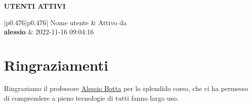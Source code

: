 \documentclass[letterpaper, 11pt]{article}
\begin{document}
\begin{center}
\textbf{UTENTI ATTIVI}
\end{center}

\begin{center}
  \begin{tabular}{{|p{0.476\textwidth}|p{0.476\textwidth}|}}
    \hline
        Nome utente & Attivo da\\
    \hline
        \textbf{alessio} & 2022-11-16 09:04:16\\
    \hline
  \end{tabular}
\end{center}
\section{Ringraziamenti}
\label{sec:org4a41ac3}
Ringraziamo il professore \href{mailto:a.botta@unina.it}{Alessio Botta} per lo splendido corso, che ci ha permesso di comprendere a pieno tecnologie di tutti fanno largo uso.
\end{document}
